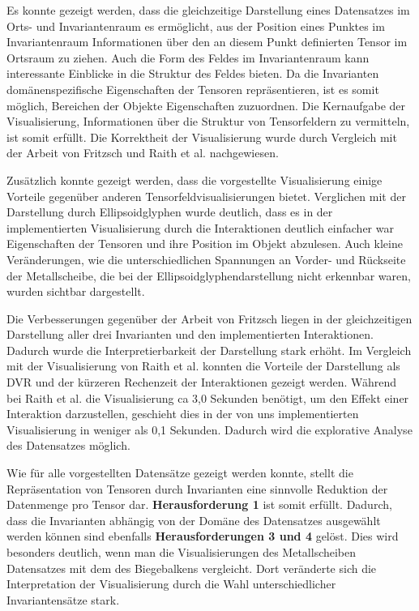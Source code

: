 \documentclass[a4paper,fontsize=12pt,toc=bib,parskip=half,ngerman]{scrartcl}
\begin{document}
Es konnte gezeigt werden, dass die gleichzeitige Darstellung eines Datensatzes im Orts- und Invariantenraum es erm\"oglicht, aus der Position eines Punktes im Invariantenraum Informationen \"uber den an diesem Punkt definierten Tensor im Ortsraum zu ziehen. Auch die Form des Feldes im Invariantenraum kann interessante Einblicke in die Struktur des Feldes bieten. Da die Invarianten dom\"anenspezifische Eigenschaften der Tensoren repr\"asentieren, ist es somit m\"oglich, Bereichen der Objekte Eigenschaften zuzuordnen. Die Kernaufgabe der Visualisierung, Informationen \"uber die Struktur von Tensorfeldern zu vermitteln, ist somit erf\"ullt. Die Korrektheit der Visualisierung wurde durch Vergleich mit der Arbeit von Fritzsch und Raith et al. nachgewiesen.

Zus\"atzlich konnte gezeigt werden, dass die vorgestellte Visualisierung einige Vorteile gegen\"uber anderen Tensorfeldvisualisierungen bietet. Verglichen mit der Darstellung durch Ellipsoidglyphen wurde deutlich, dass es in der implementierten Visualisierung durch die Interaktionen deutlich einfacher war Eigenschaften der Tensoren und ihre Position im Objekt abzulesen. Auch kleine Ver\"anderungen, wie die unterschiedlichen Spannungen an Vorder- und R\"uckseite der Metallscheibe, die bei der Ellipsoidglyphendarstellung nicht erkennbar waren, wurden sichtbar dargestellt.

Die Verbesserungen gegen\"uber der Arbeit von Fritzsch liegen in der gleichzeitigen Darstellung aller drei Invarianten und den implementierten Interaktionen. Dadurch wurde die Interpretierbarkeit der Darstellung stark erh\"oht. Im Vergleich mit der Visualisierung von Raith et al. konnten die Vorteile der Darstellung als DVR und der k\"urzeren Rechenzeit der Interaktionen gezeigt werden. W\"ahrend bei Raith et al. die Visualisierung ca 3,0 Sekunden ben\"otigt, um den Effekt einer Interaktion darzustellen, geschieht dies in der von uns implementierten Visualisierung in weniger als 0,1 Sekunden. Dadurch wird die explorative Analyse des Datensatzes m\"oglich.

Wie f\"ur alle vorgestellten Datens\"atze gezeigt werden konnte, stellt die Repr\"asentation von Tensoren durch Invarianten eine sinnvolle Reduktion der Datenmenge pro Tensor dar. \textbf{Herausforderung 1} ist somit erf\"ullt. Dadurch, dass die Invarianten abh\"angig von der Dom\"ane des Datensatzes ausgew\"ahlt werden k\"onnen sind ebenfalls \textbf{Herausforderungen 3 und 4} gel\"ost. Dies wird besonders deutlich, wenn man die Visualisierungen des Metallscheiben Datensatzes mit dem des Biegebalkens vergleicht. Dort ver\"anderte sich die Interpretation der Visualisierung durch die Wahl unterschiedlicher Invariantens\"atze stark.
\end{document}
